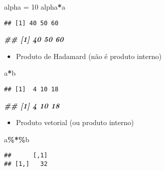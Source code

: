 \documentclass[
]{article}
\newenvironment{Shaded}{\begin{snugshade}}{\end{snugshade}}
\newcommand{\DecValTok}[1]{\textcolor[rgb]{0.00,0.00,0.81}{#1}}
\newcommand{\DocumentationTok}[1]{\textcolor[rgb]{0.56,0.35,0.01}{\textbf{\textit{#1}}}}
\newcommand{\NormalTok}[1]{#1}
\newcommand{\OtherTok}[1]{\textcolor[rgb]{0.56,0.35,0.01}{#1}}
\newcommand{\SpecialCharTok}[1]{\textcolor[rgb]{0.81,0.36,0.00}{\textbf{#1}}}
\providecommand{\tightlist}{%
  \setlength{\itemsep}{0pt}\setlength{\parskip}{0pt}}
\begin{document}
\begin{Shaded}
\begin{Highlighting}[]
\NormalTok{alpha }\OtherTok{=} \DecValTok{10}
\NormalTok{alpha}\SpecialCharTok{*}\NormalTok{a}
\end{Highlighting}
\end{Shaded}

\begin{verbatim}
## [1] 40 50 60
\end{verbatim}

\begin{Shaded}
\begin{Highlighting}[]
\DocumentationTok{\#\# [1] 40 50 60}
\end{Highlighting}
\end{Shaded}

\begin{itemize}
\tightlist
\item
  Produto de Hadamard (não é produto interno)
\end{itemize}

\begin{Shaded}
\begin{Highlighting}[]
\NormalTok{a}\SpecialCharTok{*}\NormalTok{b}
\end{Highlighting}
\end{Shaded}

\begin{verbatim}
## [1]  4 10 18
\end{verbatim}

\begin{Shaded}
\begin{Highlighting}[]
\DocumentationTok{\#\# [1] 4 10 18}
\end{Highlighting}
\end{Shaded}

\begin{itemize}
\tightlist
\item
  Produto vetorial (ou produto interno)
\end{itemize}

\begin{Shaded}
\begin{Highlighting}[]
\NormalTok{a}\SpecialCharTok{\%*\%}\NormalTok{b}
\end{Highlighting}
\end{Shaded}

\begin{verbatim}
##      [,1]
## [1,]   32
\end{verbatim}
\end{document}

